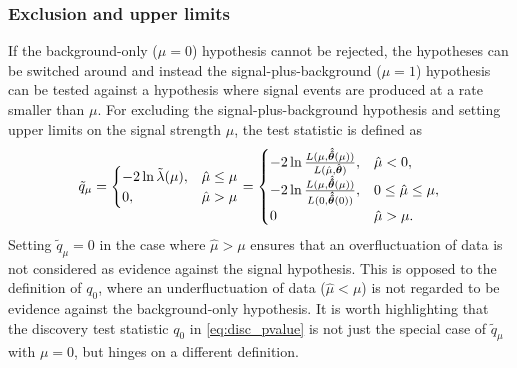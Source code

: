 \subsubsection{Exclusion and upper limits}
If the background-only ($\mu = 0$) hypothesis cannot be rejected, the hypotheses can be switched around and instead the signal-plus-background ($\mu = 1$) hypothesis can be tested against a hypothesis where signal events are produced at a rate smaller than $\mu$. For excluding the signal-plus-background hypothesis and setting upper limits on the signal strength $\mu$, the test statistic is defined as
\begin{equation}
	\tilde{q}_\mu = 
\begin{cases}
    -2\ln{\tilde{\lambda}(\mu)}, & \hat{\mu} \leq \mu				\\
    0,              & \hat{\mu} > \mu
\end{cases} =
\begin{cases}
    -2 \ln{\frac{L(\mu,\makemebold{\hat{\hat{\theta}}}(\mu))}{L(\hat{\mu},\hat{\makemebold{\theta}})}}, & \hat{\mu} < 0,\\
    -2 \ln{\frac{L(\mu,\makemebold{\hat{\hat{\theta}}}(\mu))}{L(0,\makemebold{\hat{\hat{\theta}}}(0))}},              & 0 \leq \hat{\mu} \leq \mu, \\
    0  & \hat{\mu} > \mu.
\end{cases}
\label{eq:upper_limit_test_statistic}
\end{equation}
Setting $\tilde{q}_\mu = 0$ in the case where $\hat{\mu} > \mu$ ensures that an overfluctuation of data is not considered as evidence against the signal hypothesis. This is opposed to the definition of $q_0$, where an underfluctuation of data ($\hat{\mu} < \mu$) is not regarded to be evidence against the background-only hypothesis.
It is worth highlighting that the discovery test statistic $q_0$ in \cref{eq:disc_pvalue} is not just the special case of $\tilde{q}_\mu$ with $\mu=0$, but hinges on a different definition.
 
